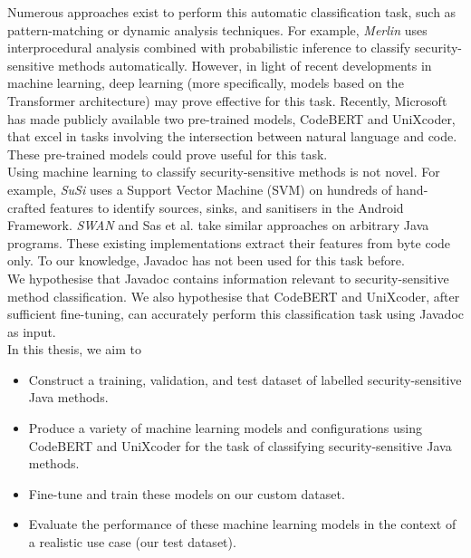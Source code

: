 \noindent
Numerous approaches exist to perform this automatic classification task, such as pattern-matching or dynamic analysis techniques. For example, \emph{Merlin} \cite{merlin} uses interprocedural analysis combined with probabilistic inference to classify security-sensitive methods automatically. However, in light of recent developments in machine learning, deep learning (more specifically, models based on the Transformer architecture) may prove effective for this task. Recently, Microsoft has made publicly available two pre-trained models, CodeBERT and UniXcoder, that excel in tasks involving the intersection between natural language and code. These pre-trained models could prove useful for this task. \\


\noindent
Using machine learning to classify security-sensitive methods is not novel. For example, \emph{SuSi} \cite{susi} uses a Support Vector Machine (SVM) on hundreds of hand-crafted features to identify sources, sinks, and sanitisers in the Android Framework. \emph{SWAN} \cite{swanassist} and Sas et al. \cite{autodetection} take similar approaches on arbitrary Java programs. These existing implementations extract their features from byte code only. To our knowledge, Javadoc has not been used for this task before. \\


\noindent
We hypothesise that Javadoc contains information relevant to security-sensitive method classification. We also hypothesise that CodeBERT and UniXcoder, after sufficient fine-tuning, can accurately perform this classification task using Javadoc as input. \\


\noindent
In this thesis, we aim to
\begin{itemize}
    \item Construct a training, validation, and test dataset of labelled security-sensitive Java methods.
    \item Produce a variety of machine learning models and configurations using CodeBERT and UniXcoder for the task of classifying security-sensitive Java methods.
    \item Fine-tune and train these models on our custom dataset.
    \item Evaluate the performance of these machine learning models in the context of a realistic use case (our test dataset).
\end{itemize}

